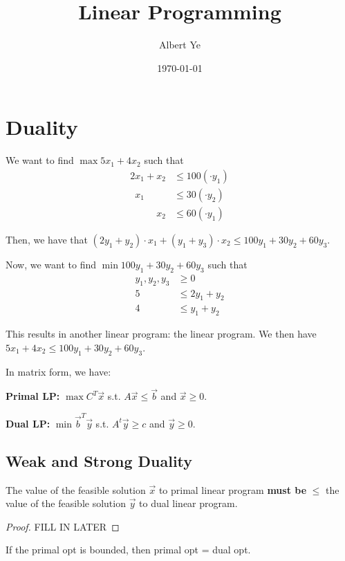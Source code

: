 \documentclass{article}
\title{Linear Programming}
\author{Albert Ye}
\date{\today}
\begin{document}
\maketitle
\section{Duality}
We want to find $\max 5x_1 + 4x_2$ such that 
\begin{align*}
    2x_1 + x_2 &\leq 100 (\cdot y_1) \\
    \phantom{2}x_1 \phantom{+ x_2} &\leq 30 (\cdot y_2) \\
    \phantom{2x_1 +} x_2 &\leq 60 (\cdot y_1)
\end{align*}

Then, we have that $(2y_1+y_2) \cdot x_1 + (y_1 + y_3) \cdot x_2 \leq 100y_1 + 30y_2 + 60y_3$.

Now, we want to find $\min 100y_1 + 30y_2 + 60y_3$ such that
\begin{align*}
    y_1, y_2, y_3 &\geq 0 \\
    5 &\leq 2y_1 + y_2 \\
    4 &\leq y_1 + y_2
\end{align*}

This results in another linear program: the  linear program. We then have $5x_1 + 4x_2 \leq 100y_1 + 30y_2 + 60y_3$.

In matrix form, we have:

\textbf{Primal LP:}
$\max C^T \vec{x}$ s.t. $A \vec x \leq \vec b$ and $\vec x \geq 0$.

\textbf{Dual LP:}
$\min \vec b^T \vec y$ s.t. $A^t \vec y \geq c$ and $\vec y \geq 0$.

\subsection{Weak and Strong Duality}

\begin{theorem}
    The value of the feasible solution $\vec x$ to primal linear program \textbf{must be} $\leq$ the value of the feasible solution $\vec y$ to dual linear program.
\end{theorem}

\begin{proof}
    FILL IN LATER
\end{proof}

\begin{theorem}
    If the primal opt is bounded, then primal opt = dual opt.
\end{theorem}
\end{document}
